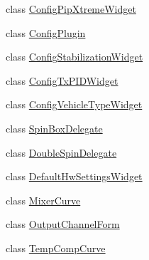 \begin{DoxyCompactItemize}
\item 
class \hyperlink{class_config_pip_xtreme_widget}{Config\-Pip\-Xtreme\-Widget}
\item 
class \hyperlink{class_config_plugin}{Config\-Plugin}
\item 
class \hyperlink{class_config_stabilization_widget}{Config\-Stabilization\-Widget}
\item 
class \hyperlink{class_config_tx_p_i_d_widget}{Config\-Tx\-P\-I\-D\-Widget}
\item 
class \hyperlink{class_config_vehicle_type_widget}{Config\-Vehicle\-Type\-Widget}
\item 
class \hyperlink{class_spin_box_delegate}{Spin\-Box\-Delegate}
\item 
class \hyperlink{class_double_spin_delegate}{Double\-Spin\-Delegate}
\item 
class \hyperlink{class_default_hw_settings_widget}{Default\-Hw\-Settings\-Widget}
\item 
class \hyperlink{class_mixer_curve}{Mixer\-Curve}
\item 
class \hyperlink{class_output_channel_form}{Output\-Channel\-Form}
\item 
class \hyperlink{class_temp_comp_curve}{Temp\-Comp\-Curve}
\end{DoxyCompactItemize}
